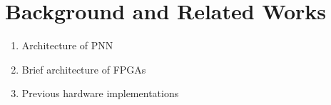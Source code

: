 \section{Background and Related Works}
\label{sec_related}

\begin{enumerate}
\item Architecture of PNN
\item Brief architecture of FPGAs
\item Previous hardware implementations
\end{enumerate}
